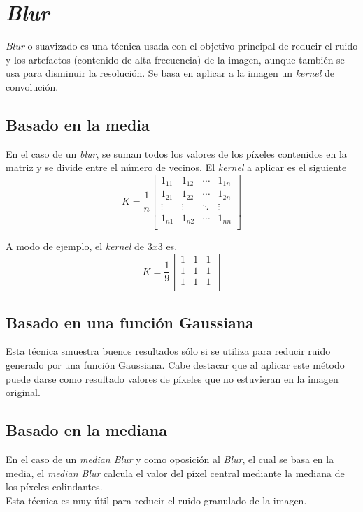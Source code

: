 \section{\emph{Blur}}
\emph{Blur} o suavizado es una técnica usada con el objetivo principal de
reducir el ruido y los artefactos (contenido de alta frecuencia) de la
imagen, aunque también se usa para disminuir la resolución. Se basa en
aplicar a la imagen un \emph{kernel} de convolución.
\subsection{Basado en la media}
En el caso de un \emph{blur}, se suman todos los valores de los
píxeles contenidos en la matriz y se divide entre el número de
vecinos. El \emph{kernel} a aplicar es el siguiente
\begin{equation*}
  K = \frac{1}{n}
  \begin{bmatrix}
    1_{11} & 1_{12} & \cdots & 1_{1n} \\
    1_{21} & 1_{22} & \cdots & 1_{2n} \\
    \vdots & \vdots & \ddots & \vdots \\
    1_{n1} & 1_{n2} & \cdots & 1_{nn} \\
  \end{bmatrix}
\end{equation*}

A modo de ejemplo, el \emph{kernel} de $3x3$ es.
\begin{equation*}
  K = \frac{1}{9}
  \begin{bmatrix}
    1 & 1 & 1 \\
    1 & 1 & 1 \\
    1 & 1 & 1 \\
  \end{bmatrix}
\end{equation*}
\subsection{Basado en una función Gaussiana}
Esta técnica smuestra buenos resultados sólo si se utiliza para
reducir ruido generado por una función Gaussiana. Cabe destacar que al
aplicar este método puede darse como resultado valores de píxeles que
no estuvieran en la imagen original. 
\subsection{Basado en la mediana}
En el caso de un \emph{median Blur} y como oposición al \emph{Blur},
el cual se basa en la media, el \emph{median Blur} calcula el valor
del píxel central mediante la mediana de los píxeles colindantes. \\
Esta técnica es muy útil para reducir el ruido granulado de la
imagen. 

